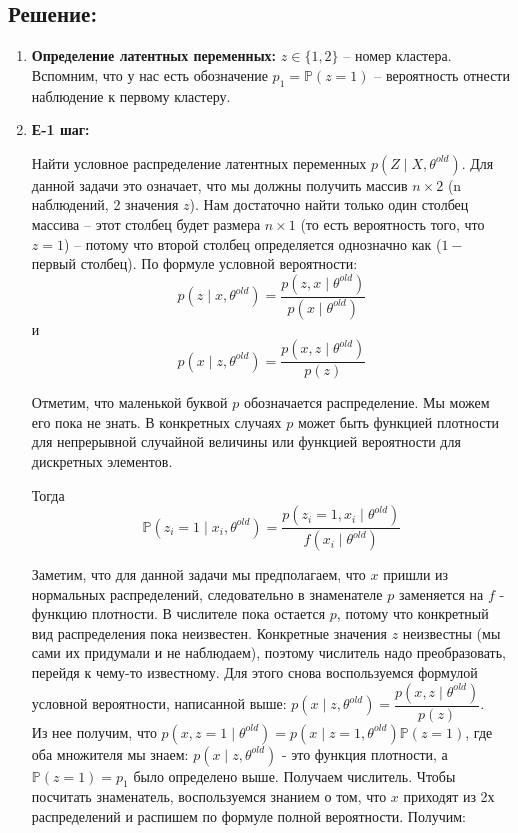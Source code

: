 \documentclass[12pt,letterpaper]{article}
\begin{document}
\subsection*{Решение:}
{
    \begin{enumerate}
        \item \textbf{Определение латентных переменных:} 
        {
            $z \in \{1, 2\}$ -- номер кластера. Вспомним, что у нас есть обозначение $p_1 = \mathbb{P}(z = 1)$ -- вероятность отнести наблюдение к первому кластеру.
        }
        
        \item \textbf{Е-1 шаг:} 
        {
            Найти условное распределение латентных переменных $p(Z \mid X, \theta^{old})$. Для данной задачи это означает, что мы должны получить массив $n\times2$ (n наблюдений, 2 значения $z$). Нам достаточно найти только один столбец массива -- этот столбец будет размера $n\times1$ (то есть вероятность того, что $z = 1$) -- потому что второй столбец определяется однозначно как ($1 - $ первый столбец).
            По формуле условной вероятности:
            $$p(z \mid x, \theta^{old}) = \dfrac{p(z, x \mid \theta^{old})}{p(x \mid \theta^{old})}$$
            и $$p(x \mid z, \theta^{old}) = \dfrac{p(x, z \mid \theta^{old})}{p(z)}$$
            
            Отметим, что маленькой буквой $p$ обозначается распределение. Мы можем его пока не знать. В конкретных случаях $p$ может быть функцией плотности для непрерывной случайной величины или функцией вероятности для дискретных элементов.
            
            Тогда
            $$\mathbb{P}(z_i = 1 \mid x_i, \theta^{old}) = \dfrac{p(z_i = 1, x_i \mid \theta^{old})}{f(x_i \mid \theta^{old})} $$
            
            Заметим, что для данной задачи мы предполагаем, что $x$ пришли из нормальных распределений, следовательно в знаменателе $p$ заменяется на $f$ - функцию плотности. В числителе пока остается $p$, потому что конкретный вид распределения пока неизвестен. Конкретные значения $z$ неизвестны (мы сами их придумали и не наблюдаем), поэтому числитель надо преобразовать, перейдя к чему-то известному. Для этого снова воспользуемся формулой условной вероятности, написанной выше: $p(x \mid z, \theta^{old}) = \dfrac{p(x, z \mid \theta^{old})}{p(z)}$.\\
            Из нее получим, что $p(x, z = 1 \mid \theta^{old}) = p(x \mid z = 1, \theta^{old})\mathbb{P}(z = 1)$, где оба множителя мы знаем: $p(x \mid z, \theta^{old})$ - это функция плотности, а $\mathbb{P}(z=1) = p_1$ было определено выше. Получаем числитель. Чтобы посчитать знаменатель, воспользуемся знанием о том, что $x$ приходят из 2х распределений и распишем по формуле полной вероятности. Получим:
            
}
\end{enumerate}}
\end{document}
